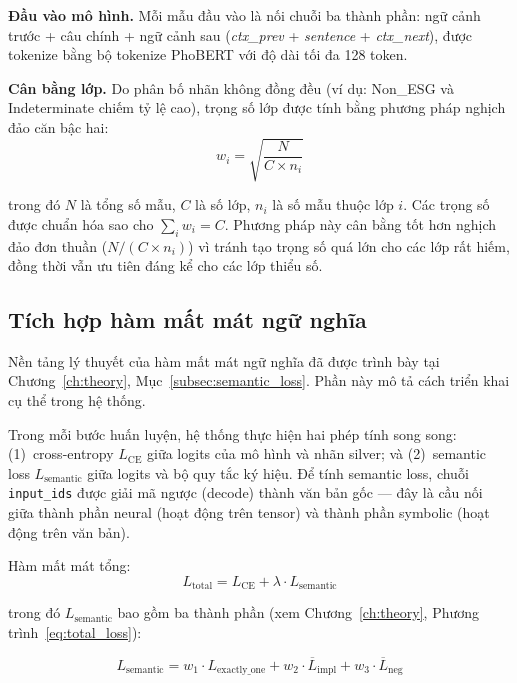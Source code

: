 \textbf{Đầu vào mô hình.} Mỗi mẫu đầu vào là nối chuỗi ba thành phần: ngữ cảnh trước + câu chính + ngữ cảnh sau (\textit{ctx\_prev} + \textit{sentence} + \textit{ctx\_next}), được tokenize bằng bộ tokenize PhoBERT với độ dài tối đa 128 token.

\textbf{Cân bằng lớp.} Do phân bố nhãn không đồng đều (ví dụ: Non\_ESG và Indeterminate chiếm tỷ lệ cao), trọng số lớp được tính bằng phương pháp nghịch đảo căn bậc hai:
\begin{equation}
    w_i = \sqrt{\frac{N}{C \times n_i}}
    \label{eq:class_weights}
\end{equation}

\noindent trong đó $N$ là tổng số mẫu, $C$ là số lớp, $n_i$ là số mẫu thuộc lớp $i$. Các trọng số được chuẩn hóa sao cho $\sum_i w_i = C$. Phương pháp này cân bằng tốt hơn nghịch đảo đơn thuần ($N / (C \times n_i)$) vì tránh tạo trọng số quá lớn cho các lớp rất hiếm, đồng thời vẫn ưu tiên đáng kể cho các lớp thiểu số.


\subsection{Tích hợp hàm mất mát ngữ nghĩa}
\label{subsec:training_semantic_loss}

Nền tảng lý thuyết của hàm mất mát ngữ nghĩa đã được trình bày tại Chương~\ref{ch:theory}, Mục~\ref{subsec:semantic_loss}. Phần này mô tả cách triển khai cụ thể trong hệ thống.

Trong mỗi bước huấn luyện, hệ thống thực hiện hai phép tính song song: (1)~cross-entropy $L_{\text{CE}}$ giữa logits của mô hình và nhãn silver; và (2)~semantic loss $L_{\text{semantic}}$ giữa logits và bộ quy tắc ký hiệu. Để tính semantic loss, chuỗi \texttt{input\_ids} được giải mã ngược (decode) thành văn bản gốc --- đây là cầu nối giữa thành phần neural (hoạt động trên tensor) và thành phần symbolic (hoạt động trên văn bản).

Hàm mất mát tổng:
\begin{equation}
    L_{\text{total}} = L_{\text{CE}} + \lambda \cdot L_{\text{semantic}}
\end{equation}

\noindent trong đó $L_{\text{semantic}}$ bao gồm ba thành phần (xem Chương~\ref{ch:theory}, Phương trình~\ref{eq:total_loss}):

\begin{equation}
    L_{\text{semantic}} = w_1 \cdot L_{\text{exactly\_one}} + w_2 \cdot \overline{L}_{\text{impl}} + w_3 \cdot \overline{L}_{\text{neg}}
\end{equation}

